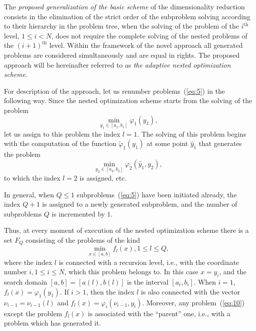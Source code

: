 \documentclass[smallextended]{svjour3}
\let\origref\ref
\renewcommand{\ref}[1]{(\origref{#1})}
\begin{document}
The \textit{proposed generalization of the basic scheme} of the dimensionality reduction consists in the elimination of the strict order of the subproblem solving according to their hierarchy in the problem tree, when the solving of the problem of the $i^{\text{th}}$ level, $1 \leq i < N$, does not require the complete  solving of the nested problems of the $(i + 1)^{\text{th}}$ level. Within the framework of the novel approach all generated problems are considered simultaneously and are equal in rights. The proposed approach will be hereinafter referred to as \textit{the adaptive nested optimization scheme}.

For description of the approach, let us renumber problems~\ref{eq:5} in the following way. Since the nested optimization scheme starts from the solving of the problem
\begin{equation}
\label{eq:9}
\min_{y_1 \in [a_1, b_1]} \varphi_1(y_1),
\end{equation}
%
let us assign to this problem the index $l = 1$. The solving of this problem begins with the computation of the function $\widetilde{\varphi}_1(y_1)$ at some point $\hat{y}_1$ that generates the problem
\begin{equation*}
\min_{y_2 \in [a_2, b_2]} \varphi_2(\hat{y}_1, y_2),
\end{equation*}
%
to which the index $l = 2$ is assigned, etc.

In general, when $Q \leq 1$ subproblems~\ref{eq:5} have been initiated already, the index $Q + 1$ is assigned to a newly generated subproblem, and the number of subproblems $Q$ is incremented by $1$.

Thus, at every moment of execution of the nested optimization scheme there is a set $F_Q$ consisting of the problems of the kind
\begin{equation}
\label{eq:10}
\min_{x \in [a, b]} f_l(x), 1 \leq l \leq Q,
\end{equation}
%
where the index $l$ is connected with a recursion level, i.e., with the coordinate number $i, 1 \leq i \leq N$, which this problem belongs to. In this case $x = y_i$, and the search domain $[a, b] = [a(l), b(l)]$ is the interval $[a_i, b_i]$. When $i = 1$, $f_l(x) = \varphi_1(y_1)$. If $i > 1$, then the index $l$ is also connected with the vector $\nu_{i - 1} = \nu_{i - 1}(l)$ and $f_l(x) = \varphi_i(\nu_{i - 1}, y_i)$. Moreover, any problem~\ref{eq:10} except the problem $f_l(x)$ is associated with the ``parent'' one, i.e., with a problem which has generated it.
\end{document}
